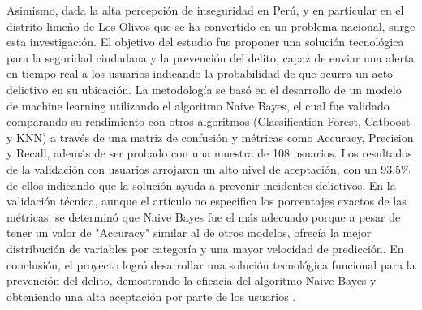 \documentclass[runningheads]{llncs}
\begin{document}
Asimismo, dada la alta percepción de inseguridad en Perú, y en particular en el
distrito limeño de Los Olivos que se ha convertido en un problema nacional,
surge esta investigación. El objetivo del estudio fue proponer una solución
tecnológica para la seguridad ciudadana y la prevención del delito, capaz de
enviar una alerta en tiempo real a los usuarios indicando la probabilidad de que
ocurra un acto delictivo en su ubicación. La metodología se basó en el
desarrollo de un modelo de machine learning utilizando el algoritmo Naive
Bayes, el cual fue validado comparando su rendimiento con otros algoritmos
(Classification Forest, Catboost y KNN) a través de una matriz de confusión y
métricas como Accuracy, Precision y Recall, además de ser probado con una
muestra de 108 usuarios. Los resultados de la validación con usuarios arrojaron
un alto nivel de aceptación, con un 93.5\% de ellos indicando que la solución
ayuda a prevenir incidentes delictivos. En la validación técnica, aunque el
artículo no especifica los porcentajes exactos de las métricas, se determinó que
Naive Bayes fue el más adecuado porque a pesar de tener un valor de "Accuracy"
similar al de otros modelos, ofrecía la mejor distribución de variables por
categoría y una mayor velocidad de predicción. En conclusión, el proyecto logró
desarrollar una solución tecnológica funcional para la prevención del delito,
demostrando la eficacia del algoritmo Naive Bayes y obteniendo una alta
aceptación por parte de los usuarios \cite{mansilla2023}.



\end{document}
